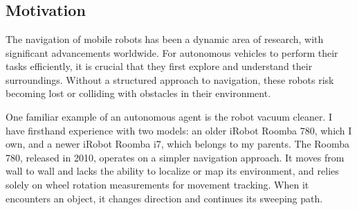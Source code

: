 \chapter{\bevezetes}

\section{Motivation}

The navigation of mobile robots has been a dynamic area of research, with significant advancements worldwide. For autonomous vehicles to perform their tasks efficiently, it is crucial that they first explore and understand their surroundings. Without a structured approach to navigation, these robots risk becoming lost or colliding with obstacles in their environment.

One familiar example of an autonomous agent is the robot vacuum cleaner. I have firsthand experience with two models: an older iRobot Roomba 780, which I own, and a newer iRobot Roomba i7, which belongs to my parents. The Roomba 780, released in 2010, operates on a simpler navigation approach. It moves from wall to wall and lacks the ability to localize or map its environment, and relies solely on wheel rotation measurements for movement tracking. When it encounters an object, it changes direction and continues its sweeping path.

